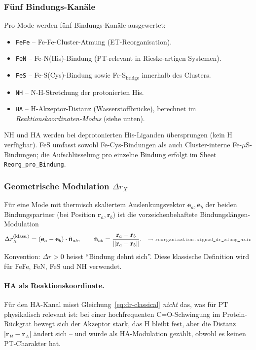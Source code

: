 \documentclass[11pt,a4paper,twoside]{article}
\newcommand{\codref}[1]{%
  \quad\text{\textcolor{gray!70!black}{\footnotesize $\rightsquigarrow$~\texttt{#1}}}}
\theoremstyle{remark}
\begin{document}
\subsubsection*{F\"unf Bindungs-Kan\"ale}

Pro Mode werden f\"unf Bindungs-Kan\"ale ausgewertet:

\begin{itemize}\setlength{\itemsep}{0pt}
  \item \texttt{FeFe} -- Fe-Fe-Cluster-Atmung (ET-Reorganisation).
  \item \texttt{FeN} -- Fe-N(His)-Bindung (PT-relevant in
        Rieske-artigen Systemen).
  \item \texttt{FeS} -- Fe-S(Cys)-Bindung sowie Fe-S$_\text{bridge}$
        innerhalb des Clusters.
  \item \texttt{NH} -- N-H-Stretchung der protonierten His.
  \item \texttt{HA} -- H-Akzeptor-Distanz (Wasserstoffbr\"ucke), berechnet
        im \emph{Reaktionskoordinaten-Modus} (siehe unten).
\end{itemize}

NH und HA werden bei deprotonierten His-Liganden \"ubersprungen
(kein H verf\"ugbar). FeS umfasst sowohl Fe-Cys-Bindungen als auch
Cluster-interne Fe-$\mu$S-Bindungen; die Aufschl\"usselung pro einzelne
Bindung erfolgt im Sheet \texttt{Reorg\_pro\_Bindung}.

\subsubsection*{Geometrische Modulation $\Delta r_X$}

F\"ur eine Mode mit thermisch skaliertem Auslenkungsvektor
$\mathbf{e}_a, \mathbf{e}_b$ der beiden Bindungspartner (bei
Position $\mathbf{r}_a, \mathbf{r}_b$) ist die vorzeichenbehaftete
Bindungsl\"angen-Modulation
\begin{equation}
  \Delta r_X^\text{(klass.)}
  = (\mathbf{e}_a - \mathbf{e}_b) \cdot \hat{\mathbf{n}}_{ab},
  \qquad
  \hat{\mathbf{n}}_{ab} = \frac{\mathbf{r}_a - \mathbf{r}_b}{\|\mathbf{r}_a - \mathbf{r}_b\|}.
  \codref{reorganization.signed\_dr\_along\_axis}
  \label{eq:dr-classical}
\end{equation}
Konvention: $\Delta r > 0$ heisst "`Bindung dehnt sich"'.
Diese klassische Definition wird f\"ur FeFe, FeN, FeS und NH verwendet.

\paragraph{HA als Reaktionskoordinate.}
F\"ur den HA-Kanal misst Gleichung~\ref{eq:dr-classical} \emph{nicht}
das, was f\"ur PT physikalisch relevant ist: bei einer hochfrequenten
C=O-Schwingung im Protein-R\"uckgrat bewegt sich der Akzeptor stark,
das H bleibt fest, aber die Distanz $|\mathbf{r}_H - \mathbf{r}_A|$
\"andert sich -- und w\"urde als HA-Modulation gez\"ahlt, obwohl es
keinen PT-Charakter hat.
\end{document}
